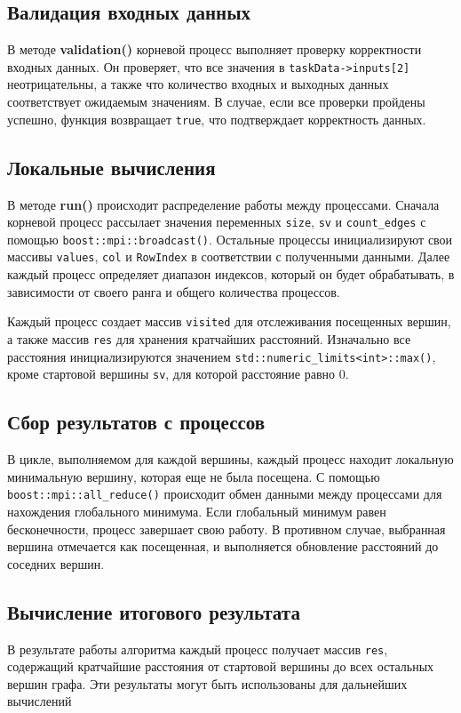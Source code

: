\documentclass[12pt]{article}
\begin{document}
\subsection*{Валидация входных данных}
В методе \textbf{validation()} корневой процесс выполняет проверку корректности входных данных. Он проверяет, что все значения в \texttt{taskData->inputs[2]} неотрицательны, а также что количество входных и выходных данных соответствует ожидаемым значениям. В случае, если все проверки пройдены успешно, функция возвращает \texttt{true}, что подтверждает корректность данных.

\subsection*{Локальные вычисления}
В методе \textbf{run()} происходит распределение работы между процессами. Сначала корневой процесс рассылает значения переменных \texttt{size}, \texttt{sv} и \texttt{count\_edges} с помощью \texttt{boost::mpi::broadcast()}. Остальные процессы инициализируют свои массивы \texttt{values}, \texttt{col} и \texttt{RowIndex} в соответствии с полученными данными. Далее каждый процесс определяет диапазон индексов, который он будет обрабатывать, в зависимости от своего ранга и общего количества процессов.

Каждый процесс создает массив \texttt{visited} для отслеживания посещенных вершин, а также массив \texttt{res} для хранения кратчайших расстояний. Изначально все расстояния инициализируются значением \texttt{std::numeric\_limits<int>::max()}, кроме стартовой вершины \texttt{sv}, для которой расстояние равно 0.

\subsection*{Сбор результатов с процессов}
В цикле, выполняемом для каждой вершины, каждый процесс находит локальную минимальную вершину, которая еще не была посещена. С помощью \texttt{boost::mpi::all\_reduce()} происходит обмен данными между процессами для нахождения глобального минимума. Если глобальный минимум равен бесконечности, процесс завершает свою работу. В противном случае, выбранная вершина отмечается как посещенная, и выполняется обновление расстояний до соседних вершин.

\subsection*{Вычисление итогового результата}
В результате работы алгоритма каждый процесс получает массив \texttt{res}, содержащий кратчайшие расстояния от стартовой вершины до всех остальных вершин графа. Эти результаты могут быть использованы для дальнейших вычислений 
\newpage
\end{document}
